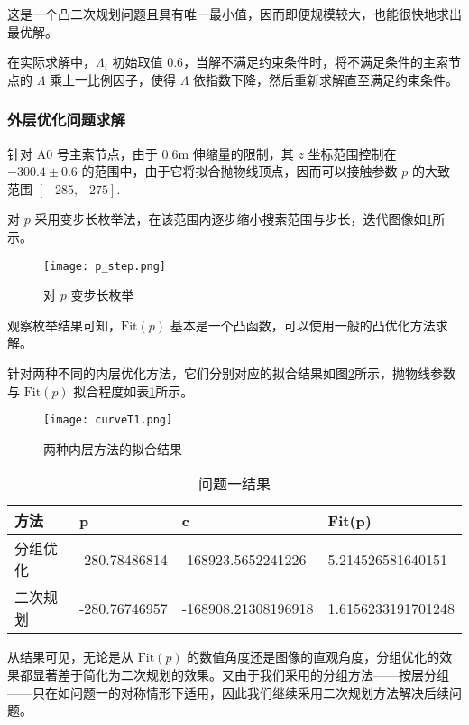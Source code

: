 \documentclass[withoutpreface,bwprint,fontset=macnew]{cumcmthesis} %
\begin{document}
		这是一个凸二次规划问题且具有唯一最小值，因而即便规模较大，也能很快地求出最优解。

		在实际求解中，$\Lambda_i$ 初始取值 $0.6$，当解不满足约束条件时，将不满足条件的主索节点的 $\Lambda$ 乘上一比例因子，使得 $\Lambda$ 依指数下降，然后重新求解直至满足约束条件。
		
	\subsubsection{外层优化问题求解}
		
		针对 A0 号主索节点，由于 0.6m 伸缩量的限制，其 $z$ 坐标范围控制在 $-300.4\pm0.6$ 的范围中，由于它将拟合抛物线顶点，因而可以接触参数 $p$ 的大致范围 $[-285, -275]$.
		
		对 $p$ 采用变步长枚举法，在该范围内逐步缩小搜索范围与步长，迭代图像如\ref{fig:p_step}所示。
		
		\begin{figure}[!h]
			\centering
			\texttt{[image: p\_step.png]} %
			\caption{对 $p$ 变步长枚举}
			\label{fig:p_step}
		\end{figure}
	
		观察枚举结果可知，$\text{Fit}(p)$ 基本是一个凸函数，可以使用一般的凸优化方法求解。
		
		针对两种不同的内层优化方法，它们分别对应的拟合结果如图\ref{fig:curveT1}所示，抛物线参数与 $\text{Fit}(p)$ 拟合程度如表\ref{tab:resultT1}所示。
		
		\begin{figure}[!h]
			\centering
			\texttt{[image: curveT1.png]} %
			\caption{两种内层方法的拟合结果}
			\label{fig:curveT1}
		\end{figure}
	
		\begin{table}[!h]
			\centering
			\begin{tabular}{|l|l|l|l|}
				\hline
				方法 & p & c & Fit(p) \\ \hline
				分组优化 & -280.78486814 & -168923.5652241226 & 5.214526581640151 \\ \hline
				二次规划 & -280.76746957 & -168908.21308196918 & 1.6156233191701248 \\ \hline
			\end{tabular}
			\caption{问题一结果}
			\label{tab:resultT1}
		\end{table}
	
		从结果可见，无论是从 $\text{Fit}(p)$ 的数值角度还是图像的直观角度，分组优化的效果都显著差于简化为二次规划的效果。又由于我们采用的分组方法——按层分组——只在如问题一的对称情形下适用，因此我们继续采用二次规划方法解决后续问题。
		
\end{document}
